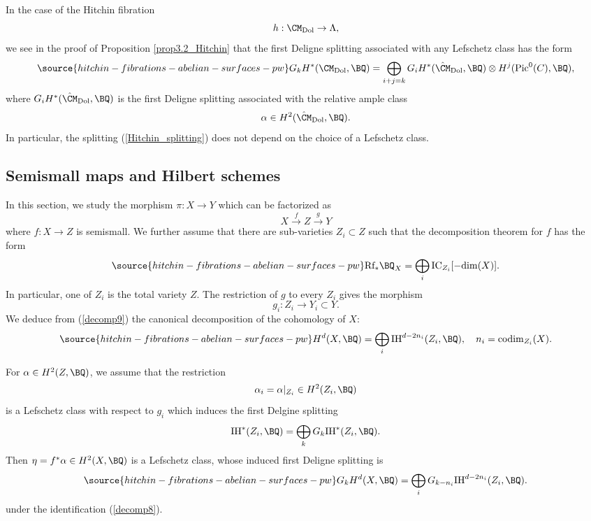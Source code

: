 \begin{rmk}
\notready
In the case of the Hitchin fibration
\[
h: \CM_{\mathrm{Dol}} \to  \Lambda,
\]
we see in the proof of Proposition \ref{prop3.2_Hitchin} that the first Deligne splitting associated with any Lefschetz class has the form
\begin{equation}\label{Hitchin_splitting}
\source{hitchin-fibrations-abelian-surfaces-pw}
G_k H^*(\CM_{\mathrm{Dol}}, \BQ) = \bigoplus_{i+j=k} G_iH^*(\hat{\CM}_{\mathrm{Dol}}, \BQ) \otimes H^j(\mathrm{Pic}^0(C), \BQ),
\end{equation}
where $G_iH^*(\hat{\CM}_{\mathrm{Dol}}, \BQ)$ is the first Deligne splitting associated with the relative ample class
\[
\alpha \in H^2(\hat{\CM}_{\mathrm{Dol}}, \BQ).
\]
In particular, the splitting (\ref{Hitchin_splitting}) does not depend on the choice of a Lefschetz class.
\end{rmk}

\subsection{Semismall maps and Hilbert schemes}\label{Section3.4}
In this section, we study the morphism $\pi: X \to Y$ which can be factorized as
\[
X \xrightarrow{f} Z \xrightarrow{g} Y
\]
where $f: X \to Z$ is semismall. We further assume that there are sub-varieties $Z_i \subset Z$ such that the decomposition theorem for $f$ has the form
\begin{equation}\label{decomp9}
\source{hitchin-fibrations-abelian-surfaces-pw}
\mathrm{Rf_\ast} \BQ_X = \bigoplus_i \mathrm{IC}_{Z_i}[-\mathrm{dim}(X)].
\end{equation}
In particular, one of $Z_i$ is the total variety $Z$. The restriction of $g$ to every $Z_i$ gives the morphism
\[
g_i: Z_i \to Y_i \subset Y.
\]
We deduce from (\ref{decomp9}) the canonical decomposition of the cohomology of $X$:
\begin{equation}\label{decomp8}
\source{hitchin-fibrations-abelian-surfaces-pw}
H^d(X, \BQ) = \bigoplus_i \mathrm{IH}^{d-2n_i}(Z_i, \BQ), \quad n_i = \mathrm{codim}_{Z_i}(X).
\end{equation}

\begin{prop}
\notready\label{proposition3.5}
For $\alpha \in H^2(Z, \BQ)$, we assume that the restriction
\[
\alpha_i = \alpha|_{Z_i} \in H^2(Z_i, \BQ)
\]
is a Lefschetz class with respect to $g_i$ which induces the first Delgine splitting
\[
\mathrm{IH}^*(Z_i, \BQ) = \bigoplus_k G_k \mathrm{IH}^*(Z_i, \BQ).
\]
Then $\eta = f^*\alpha \in H^2(X, \BQ)$ is a Lefschetz class, whose induced first Deligne splitting is
\begin{equation}\label{decomp7}
\source{hitchin-fibrations-abelian-surfaces-pw}
G_kH^d(X, \BQ) = \bigoplus_i G_{k-n_i}\mathrm{IH}^{d-2n_i}(Z_i, \BQ).
\end{equation}
under the identification (\ref{decomp8}).
\end{prop}

